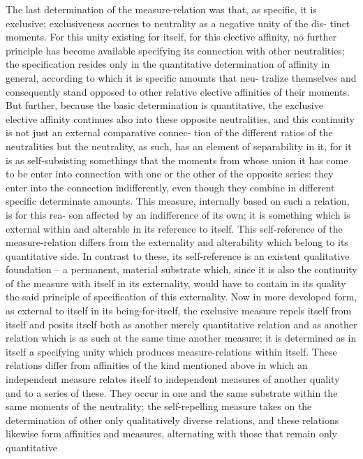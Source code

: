 The last determination of the measure-relation was that, as specific, it is
exclusive; exclusiveness accrues to neutrality as a negative unity of the dis-
tinct moments. For this unity existing for itself, for this elective affinity, no
further principle has become available specifying its connection with other
neutralities; the specification resides only in the quantitative determination
of affinity in general, according to which it is specific amounts that neu-
tralize themselves and consequently stand opposed to other relative elective
affinities of their moments. But further, because the basic determination is
quantitative, the exclusive elective affinity continues also into these opposite
neutralities, and this continuity is not just an external comparative connec-
tion of the different ratios of the neutralities but the neutrality, as such, has
an element of separability in it, for it is as self-subsisting somethings that
the moments from whose union it has come to be enter into connection
with one or the other of the opposite series: they enter into the connection
indifferently, even though they combine in different specific determinate
amounts. This measure, internally based on such a relation, is for this rea-
son affected by an indifference of its own; it is something which is external
within and alterable in its reference to itself.
This self-reference of the measure-relation differs from the externality and
alterability which belong to its quantitative side. In contrast to these, its
self-reference is an existent qualitative foundation – a permanent, material
substrate which, since it is also the continuity of the measure with itself
in its externality, would have to contain in its quality the said principle of
specification of this externality.
Now in more developed form, as external to itself in its being-for-itself,
the exclusive measure repels itself from itself and posits itself both as another
merely quantitative relation and as another relation which is as such at the
same time another measure; it is determined as in itself a specifying unity
which produces measure-relations within itself. These relations differ from
affinities of the kind mentioned above in which an independent measure
relates itself to independent measures of another quality and to a series of
these. They occur in one and the same substrate within the same moments
of the neutrality; the self-repelling measure takes on the determination of
other only qualitatively diverse relations, and these relations likewise form
affinities and measures, alternating with those that remain only quantitative

